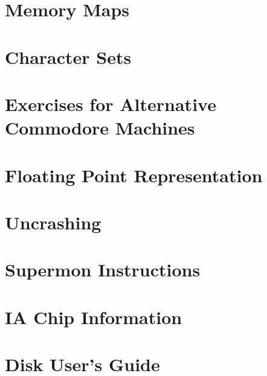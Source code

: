 \documentclass[11pt,a4paper,titlepage]{memoir}
\begin{document}
\chapter{Memory Maps}
\blindtext
\chapter{Character Sets}
\blindtext
\chapter{Exercises for Alternative Commodore Machines}
\label{app:e_251}
\blindtext
\chapter{Floating Point Representation}
\blindtext
\chapter{Uncrashing}
\blindtext
\chapter{Supermon Instructions}
\blindtext
\chapter{IA Chip Information}
\blindtext
\chapter{Disk User's Guide}
\blindtext
\end{document}
